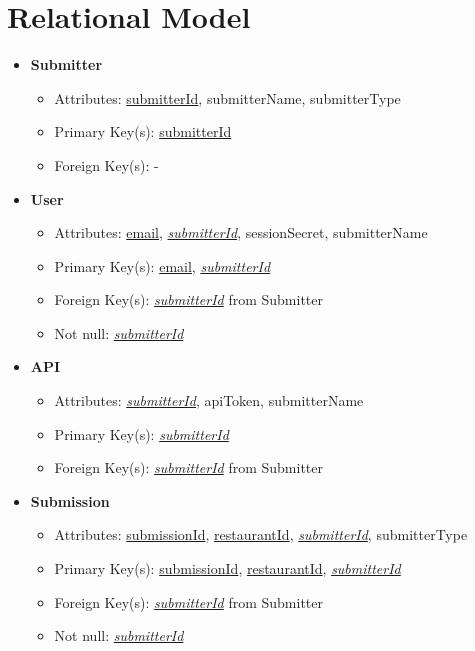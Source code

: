 \documentclass{article}
\begin{document}
\section{Relational Model}
    \begin{itemize}
        \item \textbf{Submitter}        
        \begin{itemize}
            \item Attributes: \underline{submitterId}, submitterName, submitterType
            \item Primary Key(s): \underline{submitterId}
            \item Foreign Key(s): -
        \end{itemize}

        \item \textbf{User}
        \begin{itemize}
            \item Attributes: \underline{email}, \underline{\textit{submitterId}}, sessionSecret, submitterName
            \item Primary Key(s): \underline{email}, \underline{\textit{submitterId}}
            \item Foreign Key(s): \underline{\textit{submitterId}} from Submitter
            \item Not null: \underline{\textit{submitterId}}
        \end{itemize}

        \item \textbf{API}
        \begin{itemize}
            \item Attributes: \underline{\textit{submitterId}}, apiToken, submitterName
            \item Primary Key(s): \underline{\textit{submitterId}}
            \item Foreign Key(s): \underline{\textit{submitterId}} from Submitter
        \end{itemize}

        \item \textbf{Submission}                
        \begin{itemize}
            \item Attributes: \underline{submissionId}, \underline{restaurantId}, \underline{\textit{submitterId}}, submitterType
            \item Primary Key(s): \underline{submissionId}, \underline{restaurantId}, \underline{\textit{submitterId}}
            \item Foreign Key(s): \underline{\textit{submitterId}} from Submitter
            \item Not null: \underline{\textit{submitterId}}
        \end{itemize}


\end{itemize}
\end{document}
